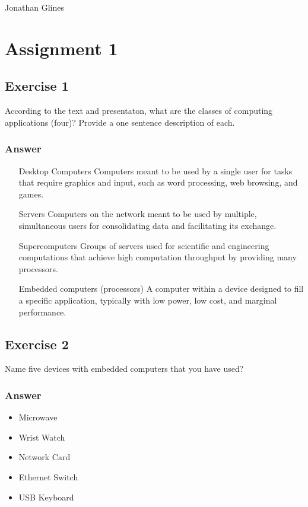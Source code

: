 \documentclass[12pt]{article}
\begin{document}
\begin{flushright}
\Large{Jonathan Glines}
\end{flushright}
\section*{Assignment 1}
\subsection*{Exercise 1}
According to the text and presentaton, what are the classes of computing applications (four)? Provide a one sentence description of each.
\subsubsection*{Answer}
\begin{itemize}
\item[Desktop Computers] Computers meant to be used by a single user for tasks that require graphics and input, such as word processing, web browsing, and games.
\item[Servers] Computers on the network meant to be used by multiple, simultaneous users for consolidating data and facilitating its exchange.
\item[Supercomputers] Groups of servers used for scientific and engineering computations that achieve high computation throughput by providing many processors.
\item[Embedded computers (processors)] A computer within a device designed to fill a specific application, typically with low power, low cost, and marginal performance.
\end{itemize}

\subsection*{Exercise 2}
Name five devices with embedded computers that you have used?
\subsubsection*{Answer}
\begin{itemize}
\item Microwave
\item Wrist Watch
\item Network Card
\item Ethernet Switch
\item USB Keyboard
\end{itemize}
\end{document}
